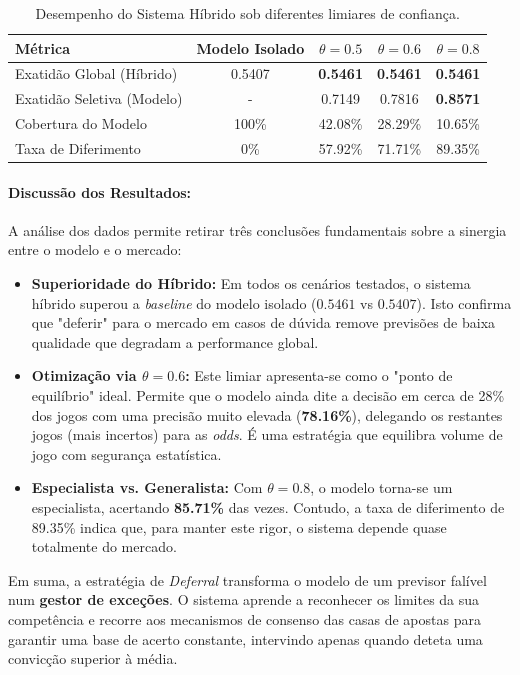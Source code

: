\documentclass[10pt]{article}
\begin{document}
\begin{table}[H]
\centering
\caption{Desempenho do Sistema Híbrido sob diferentes limiares de confiança.}
\label{tab:deferral_results}
\begin{tabular}{lcccc}
\hline
\textbf{Métrica} & \textbf{Modelo Isolado} & \textbf{$\theta=0.5$} & \textbf{$\theta=0.6$} & \textbf{$\theta=0.8$} \\ \hline
Exatidão Global (Híbrido) & 0.5407 & \textbf{0.5461} & \textbf{0.5461} & \textbf{0.5461} \\
Exatidão Seletiva (Modelo) & - & 0.7149 & 0.7816 & \textbf{0.8571} \\
Cobertura do Modelo & 100\% & 42.08\% & 28.29\% & 10.65\% \\
Taxa de Diferimento & 0\% & 57.92\% & 71.71\% & 89.35\% \\ \hline
\end{tabular}
\end{table}

\paragraph{Discussão dos Resultados:}
A análise dos dados permite retirar três conclusões fundamentais sobre a sinergia entre o modelo e o mercado:

\begin{itemize}
    \item \textbf{Superioridade do Híbrido:} Em todos os cenários testados, o sistema híbrido superou a \textit{baseline} do modelo isolado ($0.5461$ vs $0.5407$). Isto confirma que "deferir" para o mercado em casos de dúvida remove previsões de baixa qualidade que degradam a performance global.
    \item \textbf{Otimização via $\theta = 0.6$:} Este limiar apresenta-se como o "ponto de equilíbrio" ideal. Permite que o modelo ainda dite a decisão em cerca de 28\% dos jogos com uma precisão muito elevada (\textbf{78.16\%}), delegando os restantes jogos (mais incertos) para as \textit{odds}. É uma estratégia que equilibra volume de jogo com segurança estatística.
    \item \textbf{Especialista vs. Generalista:} Com $\theta=0.8$, o modelo torna-se um especialista, acertando \textbf{85.71\%} das vezes. Contudo, a taxa de diferimento de 89.35\% indica que, para manter este rigor, o sistema depende quase totalmente do mercado.
\end{itemize}

Em suma, a estratégia de \textit{Deferral} transforma o modelo de um previsor falível num \textbf{gestor de exceções}. O sistema aprende a reconhecer os limites da sua competência e recorre aos mecanismos de consenso das casas de apostas para garantir uma base de acerto constante, intervindo apenas quando deteta uma convicção superior à média.
\end{document}
